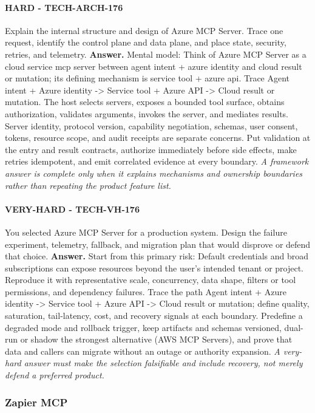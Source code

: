 \paragraph{HARD - TECH-ARCH-176} Explain the internal structure and design of Azure MCP Server. Trace one request, identify the control plane and data plane, and place state, security, retries, and telemetry.
\textbf{Answer.} Mental model: Think of Azure MCP Server as a cloud service mcp server between agent intent + azure identity and cloud result or mutation; its defining mechanism is service tool + azure api. Trace Agent intent + Azure identity -> Service tool + Azure API -> Cloud result or mutation. The host selects servers, exposes a bounded tool surface, obtains authorization, validates arguments, invokes the server, and mediates results. Server identity, protocol version, capability negotiation, schemas, user consent, tokens, resource scope, and audit receipts are separate concerns. Put validation at the entry and result contracts, authorize immediately before side effects, make retries idempotent, and emit correlated evidence at every boundary.
\textit{A framework answer is complete only when it explains mechanisms and ownership boundaries rather than repeating the product feature list.}
\paragraph{VERY-HARD - TECH-VH-176} You selected Azure MCP Server for a production system. Design the failure experiment, telemetry, fallback, and migration plan that would disprove or defend that choice.
\textbf{Answer.} Start from this primary risk: Default credentials and broad subscriptions can expose resources beyond the user's intended tenant or project. Reproduce it with representative scale, concurrency, data shape, filters or tool permissions, and dependency failures. Trace the path Agent intent + Azure identity -> Service tool + Azure API -> Cloud result or mutation; define quality, saturation, tail-latency, cost, and recovery signals at each boundary. Predefine a degraded mode and rollback trigger, keep artifacts and schemas versioned, dual-run or shadow the strongest alternative (AWS MCP Servers), and prove that data and callers can migrate without an outage or authority expansion.
\textit{A very-hard answer must make the selection falsifiable and include recovery, not merely defend a preferred product.}
\subsubsection*{Zapier MCP}
